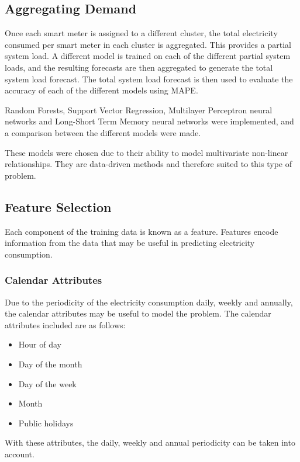 \subsection{Aggregating Demand}

Once each smart meter is assigned to a different cluster, the total electricity consumed per smart meter in each cluster is aggregated. This provides a partial system load. A different model is trained on each of the different partial system loads, and the resulting forecasts are then aggregated to generate the total system load forecast. The total system load forecast is then used to evaluate the accuracy of each of the different models using MAPE. 

Random Forests, Support Vector Regression, Multilayer Perceptron neural networks and Long-Short Term Memory neural networks were implemented, and a comparison between the different models were made. 

These models were chosen due to their ability to model multivariate non-linear relationships. They are data-driven methods and therefore suited to this type of problem.

\subsection{Feature Selection}

Each component of the training data is known as a feature. Features encode information from the data that may be useful in predicting electricity consumption. 

\subsubsection{Calendar Attributes}

Due to the periodicity of the electricity consumption daily, weekly and annually, the calendar attributes may be useful to model the problem. The calendar attributes included are as follows:

\begin{itemize}
	\item Hour of day
	\item Day of the month
	\item Day of the week
	\item Month
	\item Public holidays
\end{itemize}

With these attributes, the daily, weekly and annual periodicity can be taken into account.

